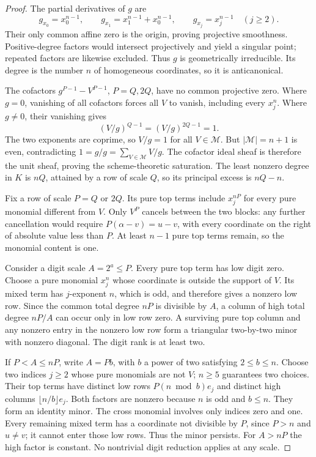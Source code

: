\begin{proof}
The partial derivatives of $g$ are
\[
 g_{x_0}=x_0^{n-1},\qquad
 g_{x_1}=x_1^{n-1}+x_0^{n-1},\qquad
 g_{x_j}=x_j^{n-1}\quad(j\ge2).
\]
Their only common affine zero is the origin, proving projective
smoothness. Positive-degree factors would intersect projectively
and yield a singular point; repeated factors are likewise excluded.
Thus $g$ is geometrically irreducible. Its degree is the number $n$
of homogeneous coordinates, so it is anticanonical.

The cofactors $g^{P-1}-V^{P-1}$, $P=Q,2Q$, have no common
projective zero. Where $g=0$, vanishing of all cofactors forces all
$V$ to vanish, including every $x_j^n$. Where $g\ne0$, their
vanishing gives
\[
 (V/g)^{Q-1}=(V/g)^{2Q-1}=1.
\]
The two exponents are coprime, so $V/g=1$ for all $V\in\mathcal M$.
But $|\mathcal M|=n+1$ is even, contradicting
$1=g/g=\sum_{V\in\mathcal M}V/g$. The cofactor ideal sheaf is
therefore the unit sheaf, proving the scheme-theoretic saturation.
The least nonzero degree in $K$ is $nQ$, attained by a row of
scale $Q$, so its principal excess is $nQ-n$.

Fix a row of scale $P=Q$ or $2Q$. Its pure top terms include
$x_j^{nP}$ for every pure monomial different from $V$.
Only $V^P$ cancels between the two blocks: any further cancellation
would require $P(\alpha-v)=u-v$, with every coordinate on the
right of absolute value less than $P$. At least $n-1$ pure top
terms remain, so the monomial content is one.

Consider a digit scale $A=2^a\le P$. Every pure top term has low
digit zero. Choose a pure monomial $x_j^n$ whose coordinate is
outside the support of $V$. Its mixed term has $j$-exponent $n$,
which is odd, and therefore gives a nonzero low row. Since the
common total degree $nP$ is divisible by $A$, a column of high
total degree $nP/A$ can occur only in low row zero. A surviving
pure top column and any nonzero entry in the nonzero low row form
a triangular two-by-two minor with nonzero diagonal. The digit
rank is at least two.

If $P<A\le nP$, write $A=Pb$, with $b$ a power of two satisfying
$2\le b\le n$. Choose two indices $j\ge2$ whose pure monomials
are not $V$; $n\ge5$ guarantees two choices. Their top terms have
distinct low rows $P(n\bmod b)e_j$ and distinct high columns
$\lfloor n/b\rfloor e_j$. Both factors are nonzero because $n$
is odd and $b\le n$. They form an identity minor. The cross
monomial involves only indices zero and one. Every remaining mixed
term has a coordinate not divisible by $P$, since $P>n$ and
$u\ne v$; it cannot enter those low rows. Thus the minor persists.
For $A>nP$ the high factor is constant. No nontrivial digit
reduction applies at any scale.


\end{proof}

